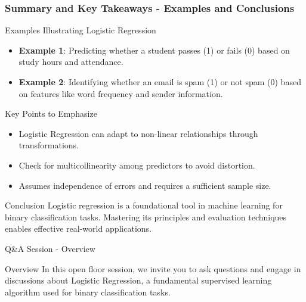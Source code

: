 \documentclass[aspectratio=169]{beamer}
\begin{document}
\begin{frame}[fragile]
    \frametitle{Summary and Key Takeaways - Examples and Conclusions}
    \begin{block}{Examples Illustrating Logistic Regression}
        \begin{itemize}
            \item \textbf{Example 1}: Predicting whether a student passes (1) or fails (0) based on study hours and attendance.
            \item \textbf{Example 2}: Identifying whether an email is spam (1) or not spam (0) based on features like word frequency and sender information.
        \end{itemize}
    \end{block}

    \begin{block}{Key Points to Emphasize}
        \begin{itemize}
            \item Logistic Regression can adapt to non-linear relationships through transformations.
            \item Check for multicollinearity among predictors to avoid distortion.
            \item Assumes independence of errors and requires a sufficient sample size.
        \end{itemize}
    \end{block}

    \begin{block}{Conclusion}
        Logistic regression is a foundational tool in machine learning for binary classification tasks. 
        Mastering its principles and evaluation techniques enables effective real-world applications.
    \end{block}
\end{frame}

\begin{frame}[fragile]{Q\&A Session - Overview}
  \begin{block}{Overview}
    In this open floor session, we invite you to ask questions and engage in discussions about Logistic Regression, 
    a fundamental supervised learning algorithm used for binary classification tasks.
  \end{block}
\end{frame}
\end{document}
